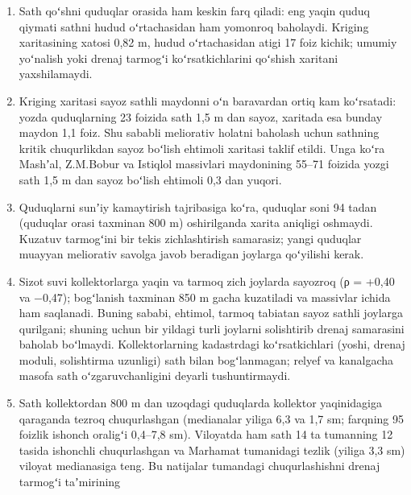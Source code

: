 \documentclass[14pt,a4paper,oneside]{extreport}
\begin{document}
\begin{enumerate}
  chuqur holat yanvar--fevralda, eng sayoz holat may--iyulda kuzatiladi.
  Yogʻinning asosiy qismi noyabr--aprelda boʻlsa-da, sath yozda
  koʻtariladi: demak, uni asosan sugʻorish va kanallardan sizib chiqqan
  suv belgilaydi. Yillik oʻrtacha sath ayrim massivlardagi yozgi xavfli
  holatni yashiradi, shuning uchun drenaj tizimini baholashda yozgi eng
  sayoz holat asosiy mezon boʻlishi kerak.
\item
  Sath qoʻshni quduqlar orasida ham keskin farq qiladi: eng yaqin quduq
  qiymati sathni hudud oʻrtachasidan ham yomonroq baholaydi. Kriging
  xaritasining xatosi 0,82 m, hudud oʻrtachasidan atigi 17 foiz kichik;
  umumiy yoʻnalish yoki drenaj tarmogʻi koʻrsatkichlarini qoʻshish
  xaritani yaxshilamaydi.
\item
  Kriging xaritasi sayoz sathli maydonni oʻn baravardan ortiq kam
  koʻrsatadi: yozda quduqlarning 23 foizida sath 1,5 m dan sayoz,
  xaritada esa bunday maydon 1,1 foiz. Shu sababli meliorativ holatni
  baholash uchun sathning kritik chuqurlikdan sayoz boʻlish ehtimoli
  xaritasi taklif etildi. Unga koʻra Mashʼal, Z.M.Bobur va Istiqlol
  massivlari maydonining 55--71 foizida yozgi sath 1,5 m dan sayoz
  boʻlish ehtimoli 0,3 dan yuqori.
\item
  Quduqlarni sunʼiy kamaytirish tajribasiga koʻra, quduqlar soni 94
  tadan (quduqlar orasi taxminan 800 m) oshirilganda xarita aniqligi
  oshmaydi. Kuzatuv tarmogʻini bir tekis zichlashtirish samarasiz; yangi
  quduqlar muayyan meliorativ savolga javob beradigan joylarga
  qoʻyilishi kerak.
\item
  Sizot suvi kollektorlarga yaqin va tarmoq zich joylarda sayozroq (ρ =
  +0,40 va −0,47); bogʻlanish taxminan 850 m gacha kuzatiladi va
  massivlar ichida ham saqlanadi. Buning sababi, ehtimol, tarmoq
  tabiatan sayoz sathli joylarga qurilgani; shuning uchun bir yildagi
  turli joylarni solishtirib drenaj samarasini baholab boʻlmaydi.
  Kollektorlarning kadastrdagi koʻrsatkichlari (yoshi, drenaj moduli,
  solishtirma uzunligi) sath bilan bogʻlanmagan; relyef va kanalgacha
  masofa sath oʻzgaruvchanligini deyarli tushuntirmaydi.
\item
  Sath kollektordan 800 m dan uzoqdagi quduqlarda kollektor yaqinidagiga
  qaraganda tezroq chuqurlashgan (medianalar yiliga 6,3 va 1,7 sm;
  farqning 95 foizlik ishonch oraligʻi 0,4--7,8 sm). Viloyatda ham sath
  14 ta tumanning 12 tasida ishonchli chuqurlashgan va Marhamat
  tumanidagi tezlik (yiliga 3,3 sm) viloyat medianasiga teng. Bu
  natijalar tumandagi chuqurlashishni drenaj tarmogʻi taʼmirining

\end{enumerate}
\end{document}
